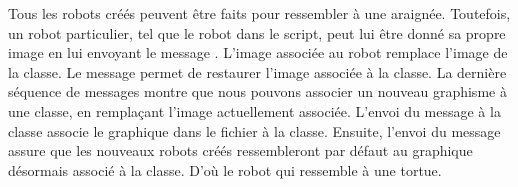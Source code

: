 \documentclass[a4paper,10pt,twoside]{book}
\begin{document}
Tous les robots cr\'e\'es peuvent \^etre faits pour ressembler \`a une araign\'ee. Toutefois, un robot particulier, tel 
que le robot  dans le script, peut lui \^etre donn\'e sa propre image en lui envoyant le message
. L'image associ\'ee au robot remplace l'image de la classe. Le message 
 permet de restaurer l'image associ\'ee \`a la classe. La derni\`ere s\'equence de 
messages montre que nous pouvons associer un nouveau graphisme \`a une classe, en remplaçant l'image 
actuellement associ\'ee. L'envoi du message  \`a la classe  
associe le graphique dans le fichier  \`a la classe. Ensuite, l'envoi du message 
 assure que les nouveaux robots cr\'e\'es ressembleront par d\'efaut au graphique 
d\'esormais associ\'e \`a la classe. D'où le robot  qui ressemble \`a une tortue.
\end{document}
